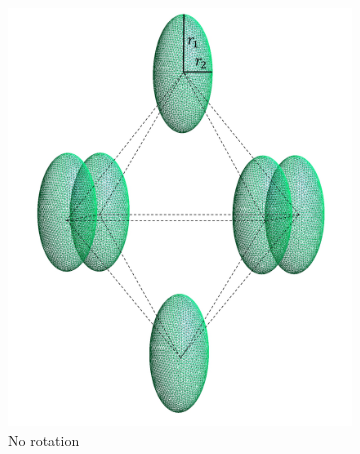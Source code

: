             \begin{figure}[H]
                \begin{subfigure}{\linewidth}
                    \centering
                    \includegraphics[scale = 0.4]{figures/6_ellip}
                    \caption{No rotation}
                    \label{No rotation 6}
                    \end{subfigure}\\[1ex]
                \begin{subfigure}{.5\linewidth}
                \centering

\end{subfigure}
\end{figure}
